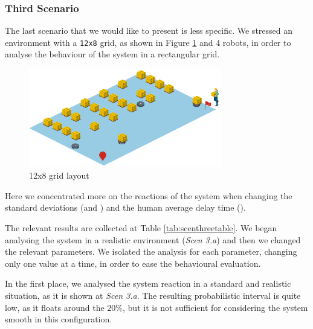 \subsubsection{Third Scenario}
The last scenario that we would like to present is less specific. We stressed an environment with a \texttt{12x8} grid, as shown in Figure \ref{fig:grid12x8} and 4 robots, in order to analyse the behaviour of the system in a rectangular grid. 

\begin{figure}
    \centering
    \includegraphics[width=0.75\textwidth]{resources/grid12x8.png}
    \caption{12x8 grid layout}
    \label{fig:grid12x8}
\end{figure}

Here we concentrated more on the reactions of the system when changing the standard deviations (\vH \space and \vT) and the human average delay time (\mH).

The relevant results are collected at Table \ref{tab:scenthreetable}. We began analysing the system in a realistic environment (\emph{Scen 3.a}) and then we changed the relevant parameters. We isolated the analysis for each parameter, changing only one value at a time, in order to ease the behavioural evaluation.

In the first place, we analysed the system reaction in a standard and realistic situation, as it is shown at \emph{Scen 3.a}. The resulting probabilistic interval is quite low, as it floats around the $20\%$, but it is not sufficient for considering the system smooth in this configuration.


